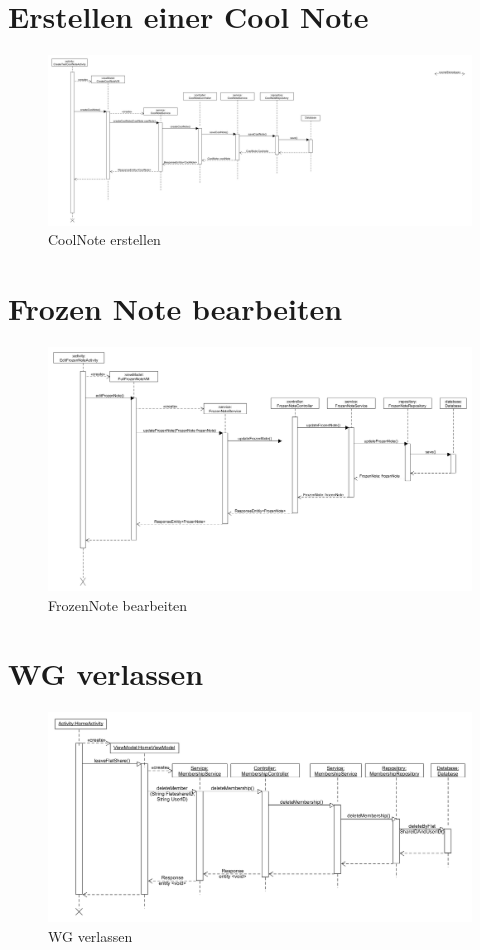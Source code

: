 \documentclass[a4paper]{scrreprt}
\begin{document}
	 
		\section{Erstellen einer Cool Note}
		 \begin{figure}[H]
	       \centering
	       \includegraphics[scale = .35]{SD_CoolNote_erstellen.png}
	       \caption{CoolNote erstellen}
	      \end{figure}
		
	      
		\section{Frozen Note bearbeiten}
 	\begin{figure}[H]
	       \centering
	       \includegraphics[scale = .35]{Sequenzdiagram_EditFrozenNote.png}
	       \caption{FrozenNote bearbeiten}
	      \end{figure}		
		
		\section{WG verlassen}
		 \begin{figure}[H]
	       \centering
	       \includegraphics[scale = .35]{SD_WG_verlassen.png}
	       \caption{WG verlassen}
	      \end{figure}
		
\end{document}
